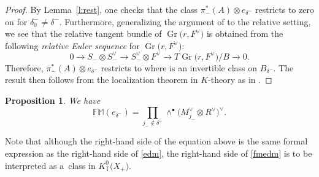 \documentclass[11pt]{article}
\numberwithin{equation}{section}
\newtheorem{Proposition}[Theorem]{Proposition}
 { \theoremstyle{definition}
\newtheorem{Definition}[Theorem]{Definition}
\newtheorem{Note}[Theorem]{Note}
\newtheorem{Example}[Theorem]{Example}
\newtheorem{Remark}[Theorem]{Remark} }
\numberwithin{equation}{section}
\newcommand{\torus}{\mathbb{T}}
\newcommand{\FM}{\mathbb{FM}}
\DeclareMathOperator{\Gr}{Gr}
\newcommand{\F}{F}
\newcommand{\MB}{M}
\begin{document}
\begin{proof}
By Lemma~\ref{l:rest}, one checks that the class $\pi_-^*(A) \otimes e_{\delta^-}$ restricts to zero on  for $\delta_0^- \neq \delta^-$. Furthermore, generalizing the argument of \cite[Section~5.1]{CKM14} to the relative setting, we see that the relative tangent bundle of $\Gr\bigl(r, \F^\vee\bigr)$ is obtained from the following \emph{relative Euler sequence} for $\Gr\bigl(r, F^\vee\bigr)$:
\begin{equation}\label{e:Euler} 0 \rightarrow S_{-} \otimes S_{-}^\vee \rightarrow S_{-}^\vee \otimes F^\vee \rightarrow T\Gr\bigl(r, \F^\vee\bigr)/ B \rightarrow 0.\end{equation} Therefore, $\pi_-^*(A) \otimes e_{\delta^-}$ restricts to \smash{$A \otimes \wedge^\bullet N_{B_{\delta^-}|\Gr(r, \F^\vee)}^\vee$} where \smash{$\wedge^\bullet N_{B_{\delta^-}|\Gr(r, \F^\vee)}^\vee$} is an invertible class on $B_{\delta^-}$. The result then follows from the localization theorem in $K$-theory as in \mbox{\cite[Section~2.3]{Oko15}}.
\end{proof}

\begin{Proposition}
We have
\begin{equation}\label{fmedm}
\FM(e_{\delta^-}) = \prod_{j_- \notin \delta^-} \wedge^\bullet \bigl(\MB_{j_-}^\vee \otimes R^\vee\bigr)^\vee.
\end{equation}
\end{Proposition}

\begin{Remark}
 Note that although the right-hand side of the equation above is the same formal expression as the right-hand side of \eqref{edm}, the right-hand side of \eqref{fmedm} is to be interpreted as a~class in $K^0_\torus\bigl(X_+\bigr)$.
\end{Remark}
\end{document}
